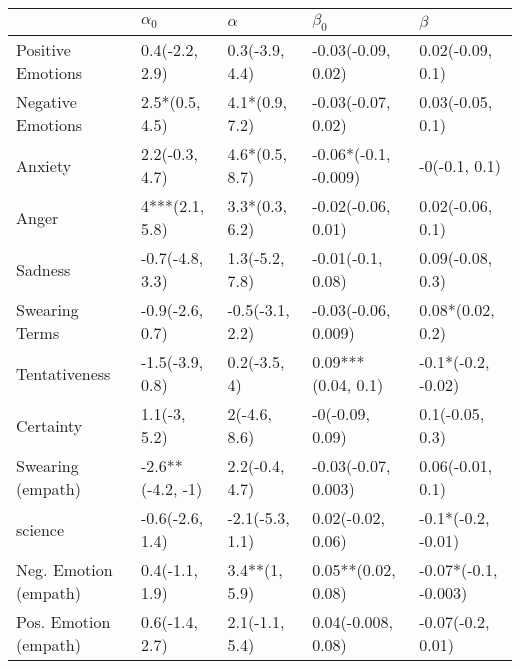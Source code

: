 \begin{tabular}{lllll}
\toprule
{} &        $\alpha_0$ &         $\alpha$ &             $\beta_0$ &               $\beta$ \\
\midrule
Positive Emotions     &    0.4(-2.2, 2.9) &   0.3(-3.9, 4.4) &    -0.03(-0.09, 0.02) &      0.02(-0.09, 0.1) \\
Negative Emotions     &    2.5*(0.5, 4.5) &   4.1*(0.9, 7.2) &    -0.03(-0.07, 0.02) &      0.03(-0.05, 0.1) \\
Anxiety               &    2.2(-0.3, 4.7) &   4.6*(0.5, 8.7) &  -0.06*(-0.1, -0.009) &         -0(-0.1, 0.1) \\
Anger                 &    4***(2.1, 5.8) &   3.3*(0.3, 6.2) &    -0.02(-0.06, 0.01) &      0.02(-0.06, 0.1) \\
Sadness               &   -0.7(-4.8, 3.3) &   1.3(-5.2, 7.8) &     -0.01(-0.1, 0.08) &      0.09(-0.08, 0.3) \\
Swearing Terms        &   -0.9(-2.6, 0.7) &  -0.5(-3.1, 2.2) &   -0.03(-0.06, 0.009) &      0.08*(0.02, 0.2) \\
Tentativeness         &   -1.5(-3.9, 0.8) &     0.2(-3.5, 4) &    0.09***(0.04, 0.1) &    -0.1*(-0.2, -0.02) \\
Certainty             &      1.1(-3, 5.2) &     2(-4.6, 8.6) &       -0(-0.09, 0.09) &       0.1(-0.05, 0.3) \\
Swearing (empath)     &  -2.6**(-4.2, -1) &   2.2(-0.4, 4.7) &   -0.03(-0.07, 0.003) &      0.06(-0.01, 0.1) \\
science               &   -0.6(-2.6, 1.4) &  -2.1(-5.3, 1.1) &     0.02(-0.02, 0.06) &    -0.1*(-0.2, -0.01) \\
Neg. Emotion (empath) &    0.4(-1.1, 1.9) &    3.4**(1, 5.9) &    0.05**(0.02, 0.08) &  -0.07*(-0.1, -0.003) \\
Pos. Emotion (empath) &    0.6(-1.4, 2.7) &   2.1(-1.1, 5.4) &    0.04(-0.008, 0.08) &     -0.07(-0.2, 0.01) \\
\bottomrule
\end{tabular}
